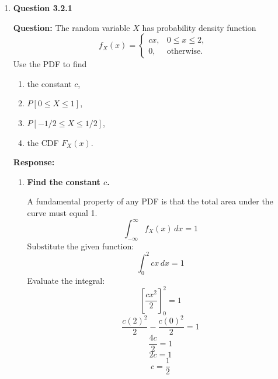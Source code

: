 \documentclass[12pt]{article}
\begin{document}
\begin{enumerate}[label=\textbf{\arabic*.}, leftmargin=*]
\begin{enumerate}[label=(\alph*)]
    \item \textbf{What is the value of $a$ such that $P[V > a] = 2/3$?}

    We know that $P[V > a] = 1 - F_V(a)$. So:
    \[ 1 - F_V(a) = \frac{2}{3} \]
    \[ F_V(a) = \frac{1}{3} \]
    Substitute the formula for $F_V(a)$:
    \[ \frac{1}{144}(a + 5)^2 = \frac{1}{3} \]
    Multiply both sides by 144:
    \[ (a + 5)^2 = \frac{144}{3} \]
    \[ (a + 5)^2 = 48 \]
    Take the square root of both sides (we take the positive root because $a$ must be greater than -5):
    \[ a + 5 = \sqrt{48} \]
    \[ a + 5 = \sqrt{16 \cdot 3} \]
    \[ a + 5 = 4\sqrt{3} \]
    Solve for $a$:
    \[ a = 4\sqrt{3} - 5 \]
    (Note: $\sqrt{3} \approx 1.732$, so $a \approx 1.93$, which is within the valid range of $-5$ to $7$.)
    \textbf{Answer:} $a = 4\sqrt{3} - 5$
\end{enumerate}

\newpage
\item \textbf{Question 3.2.1}

\textbf{Question:} The random variable $X$ has probability density function
\[
f_X(x) = \begin{cases}
cx, & 0 \le x \le 2, \\
0, & \text{otherwise.}
\end{cases}
\]
Use the PDF to find
\begin{enumerate}[label=(\alph*)]
    \item the constant $c$,
    \item $P[0 \le X \le 1]$,
    \item $P[-1/2 \le X \le 1/2]$,
    \item the CDF $F_X(x)$.
\end{enumerate}

\vspace{0.3in}

\textbf{Response:}

\begin{enumerate}[label=(\alph*)]
    \item \textbf{Find the constant $c$.}

    A fundamental property of any PDF is that the total area under the curve must equal 1.
    \[ \int_{-\infty}^{\infty} f_X(x) \, dx = 1 \]
    Substitute the given function:
    \[ \int_{0}^{2} cx \, dx = 1 \]
    Evaluate the integral:
    \[ \left[ \frac{cx^2}{2} \right]_{0}^{2} = 1 \]
    \[ \frac{c(2)^2}{2} - \frac{c(0)^2}{2} = 1 \]
    \[ \frac{4c}{2} = 1 \]
    \[ 2c = 1 \]
    \[ c = \frac{1}{2} \]


\end{enumerate}
\end{enumerate}
\end{document}
